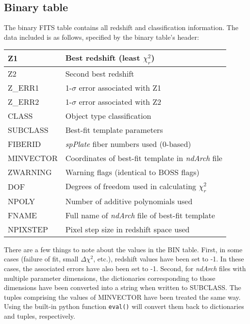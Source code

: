 \documentclass[12pt]{article}
\begin{document}
\subsection{Binary table}

The binary FITS table contains all redshift and classification information.
The data included is as follows, specified by the binary table's header:

\begin{center}
	\begin{tabular}{ | l | l | }
	\hline
	Z1 & Best redshift (least $\chi_r^2$) \\ \hline
	Z2 & Second best redshift \\ \hline
	Z\_ERR1 & 1-$\sigma$ error associated with Z1 \\ \hline
	Z\_ERR2 & 1-$\sigma$ error associated with Z2 \\ \hline
	CLASS & Object type classification \\ \hline
	SUBCLASS & Best-fit template parameters \\ \hline
	FIBERID & \textit{spPlate} fiber numbers used (0-based) \\ \hline
	MINVECTOR & Coordinates of best-fit template in \textit{ndArch} file \\ \hline
	ZWARNING & Warning flags (identical to BOSS flags) \\ \hline
	DOF & Degrees of freedom used in calculating $\chi_r^2$ \\ \hline
	NPOLY & Number of additive polynomials used \\ \hline
	FNAME & Full name of \textit{ndArch} file of best-fit template \\ \hline
	NPIXSTEP & Pixel step size in redshift space used \\
	\hline
	\end{tabular}
\end{center}

There are a few things to note about the values in the BIN table.  First, in some cases
(failure of fit, small $\Delta\chi^2$, etc.), redshift values have been set to -1.  In
these cases, the associated errors have also been set to -1.  Second, for \textit{ndArch}
files with multiple parameter dimensions, the dictionaries corresponding to those dimensions
have been converted into a string when written to SUBCLASS.  The tuples comprising the
values of MINVECTOR have been treated the same way.  Using the built-in python
function \texttt{eval()} will convert them back to dictionaries and tuples, respectively.
\end{document}
